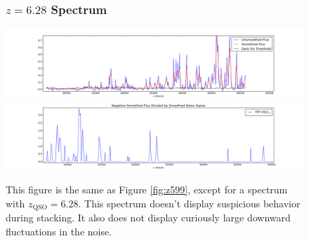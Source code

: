 \documentclass[11pt]{article}
\begin{document}
\begin{figure}[h]
\subsubsection*{$z = 6.28$ Spectrum}
  \centering
  \includegraphics[width=18cm]{z628_Spectra.png}
  \includegraphics[width=18cm]{z628_NoiseSignificance.png}
  \caption{This figure is the same as Figure \ref{fig:z599}, except for a spectrum with $z_{\text{QSO}} = 6.28$. This spectrum doesn't display suspicious behavior during stacking. It also does not display curiously large downward fluctuations in the noise.}
  \label{fig:todo}
\end{figure}
\end{document}
